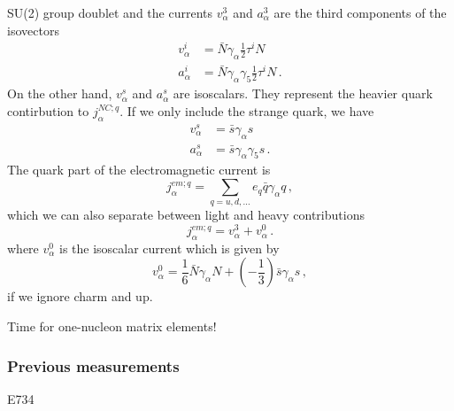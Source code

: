   SU(2) group doublet and the currents $v_{\alpha}^3$ and $a_{\alpha}^3$
  are the third components of the isovectors
  \begin{align*}
      v_{\alpha}^i &= \bar{N} \gamma_{\alpha}\frac{1}{2}\tau^i N \\
      a_{\alpha}^i &= \bar{N} \gamma_{\alpha}\gamma_5\frac{1}{2}\tau^i N \,.
  \end{align*}
  On the other hand, $v_{\alpha}^s$ and $a_{\alpha}^s$ are isoscalars. They
  represent the heavier quark contirbution to $j_{\alpha}^{NC;q}$. If we only
  include the strange quark, we have
  \begin{align*}
      v_{\alpha}^s &= \bar{s}\gamma_{\alpha}s \\
      a_{\alpha}^s &= \bar{s}\gamma_{\alpha}\gamma_5 s \,.
  \end{align*}
  The quark part of the electromagnetic current is
  \[
    j_{\alpha}^{em;q} = \sum_{q=u,d,...} e_q\bar{q} \gamma_{\alpha}q \,,
  \]
  which we can also separate between light and heavy contributions
  \[
    j_{\alpha}^{em;q} = v_{\alpha}^3 + v_{\alpha}^0 \,.
  \]
  where $v_{\alpha}^0$ is the isoscalar current which is given by
  \[
    v_{\alpha}^0 = \frac{1}{6}\bar{N}\gamma_{\alpha}N + \left(-\frac{1}{3}\right)\bar{s}\gamma_{\alpha}s \,,
  \]
  if we ignore charm and up.

  Time for one-nucleon matrix elements! 


  \subsubsection{Previous measurements}
    E734

